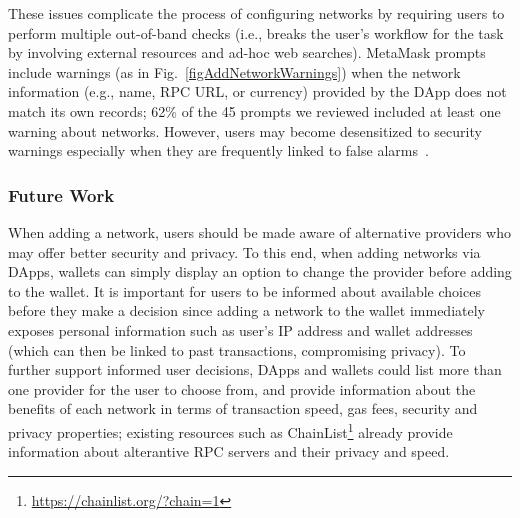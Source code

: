 \documentclass[conference]{IEEEtran}
\begin{document}
These issues complicate the process of configuring networks by requiring users to perform multiple out-of-band checks (i.e., breaks the user's workflow for the task by involving external resources and ad-hoc web searches).
MetaMask prompts include warnings (as in Fig.~\ref{figAddNetworkWarnings}) when the network information (e.g., name, RPC URL, or currency) provided by the DApp does not match its own records; 62\% of the 45 prompts we reviewed included at least one warning about networks.
However, users may become desensitized to security warnings especially when they are frequently linked to false alarms~\cite{krol2012Dont}.

\subsubsection*{\textbf{Future Work}}
When adding a network, users should be made aware of alternative providers who may offer better security and privacy.
To this end, when adding networks via DApps, wallets can simply display an option to change the provider before adding to the wallet.
It is important for users to be informed about available choices before they make a decision since adding a network to the wallet immediately exposes personal information such as user's IP address and wallet addresses (which can then be linked to past transactions, compromising privacy).
To further support informed user decisions, DApps and wallets could list more than one provider for the user to choose from, and provide information about the benefits of each network in terms of transaction speed, gas fees, security and privacy properties; existing resources such as ChainList\footnote{\url{https://chainlist.org/?chain=1}} already provide information about alterantive \ac*{RPC} servers and their privacy and speed.

\end{document}
